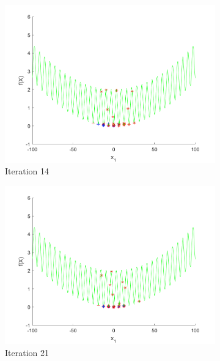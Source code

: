 \begin{figure}
\begin{subfigure}[b]{0.4\textwidth}
   \label{fig:s6-iter-1}
 \end{subfigure}
 \begin{subfigure}[b]{0.4\textwidth}
   \includegraphics[width=\textwidth]{img/smpl/grwnk1d/loa-iter-14}
   \caption{Iteration 14}
   \label{fig:s6-iter-2}
 \end{subfigure}
 \begin{subfigure}[b]{0.4\textwidth}
   \includegraphics[width=\textwidth]{img/smpl/grwnk1d/loa-iter-21}
   \caption{Iteration 21}
   \label{fig:s6-iter-3}
 \end{subfigure}
 \begin{subfigure}[b]{0.4\textwidth}

\end{subfigure}
\end{figure}
